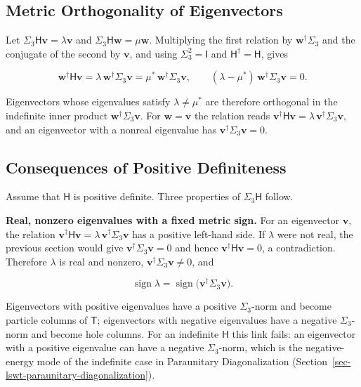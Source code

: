 \subsection{Metric Orthogonality of Eigenvectors}

Let \(\Sigma_3\mathsf H\mathbf v=\lambda\mathbf v\) and \(\Sigma_3\mathsf H\mathbf w=\mu\mathbf w\). Multiplying the first relation by \(\mathbf w^\dagger\Sigma_3\) and the conjugate of the second by \(\mathbf v\), and using \(\Sigma_3^2=\mathsf I\) and \(\mathsf H^\dagger=\mathsf H\), gives

\begin{equation}\label{eq-lswt-metric-orthogonality}
\mathbf w^\dagger\mathsf H\mathbf v=\lambda\,\mathbf w^\dagger\Sigma_3\mathbf v=\mu^*\,\mathbf w^\dagger\Sigma_3\mathbf v,
\qquad
(\lambda-\mu^*)\,\mathbf w^\dagger\Sigma_3\mathbf v=0.
\end{equation}

Eigenvectors whose eigenvalues satisfy \(\lambda\ne\mu^*\) are therefore orthogonal in the indefinite inner product \(\mathbf w^\dagger\Sigma_3\mathbf v\). For \(\mathbf w=\mathbf v\) the relation reads \(\mathbf v^\dagger\mathsf H\mathbf v=\lambda\,\mathbf v^\dagger\Sigma_3\mathbf v\), and an eigenvector with a nonreal eigenvalue has \(\mathbf v^\dagger\Sigma_3\mathbf v=0\).

\subsection{Consequences of Positive Definiteness}

Assume that \(\mathsf H\) is positive definite. Three properties of \(\Sigma_3\mathsf H\) follow.

\textbf{Real, nonzero eigenvalues with a fixed metric sign.} For an eigenvector \(\mathbf v\), the relation \(\mathbf v^\dagger\mathsf H\mathbf v=\lambda\,\mathbf v^\dagger\Sigma_3\mathbf v\) has a positive left-hand side. If \(\lambda\) were not real, the previous section would give \(\mathbf v^\dagger\Sigma_3\mathbf v=0\) and hence \(\mathbf v^\dagger\mathsf H\mathbf v=0\), a contradiction. Therefore \(\lambda\) is real and nonzero, \(\mathbf v^\dagger\Sigma_3\mathbf v\ne0\), and

\begin{equation}\label{eq-lswt-metric-sign-rule}
\operatorname{sign}\lambda=\operatorname{sign}\big(\mathbf v^\dagger\Sigma_3\mathbf v\big).
\end{equation}

Eigenvectors with positive eigenvalues have a positive \(\Sigma_3\)-norm and become particle columns of \(\mathsf T\); eigenvectors with negative eigenvalues have a negative \(\Sigma_3\)-norm and become hole columns. For an indefinite \(\mathsf H\) this link fails: an eigenvector with a positive eigenvalue can have a negative \(\Sigma_3\)-norm, which is the negative-energy mode of the indefinite case in Paraunitary Diagonalization (Section~\ref{sec-lswt-paraunitary-diagonalization}).

